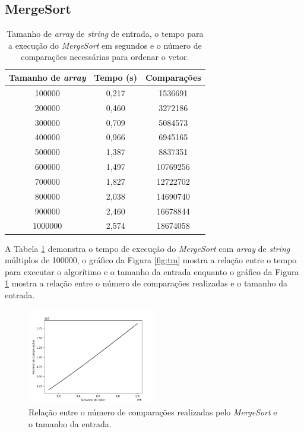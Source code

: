 \documentclass[12pt,a4paper,oneside]{article}
\begin{document}
\subsection{MergeSort}

\begin{table}[H]
\caption{Tamanho de \textit{array} de \textit{string} de entrada, o tempo para a execução do \textit{MergeSort} em segundos e o número de comparações necessárias para ordenar o vetor.}
\label{tab:dm}
\begin{center}
\begin{tabular}{|c c c|}
\hline
Tamanho de \textit{array}	& Tempo (s)	& Comparações 	\\
\hline
100000 & 0,217 & 1536691\\
200000 & 0,460 & 3272186\\
300000 & 0,709 & 5084573\\
400000 & 0,966 & 6945165\\
500000 & 1,387 & 8837351\\
600000 & 1,497 & 10769256\\
700000 & 1,827 & 12722702\\
800000 & 2,038 & 14690740\\
900000 & 2,460 & 16678844\\
1000000 & 2,574 & 18674058\\
\hline
\end{tabular}
\end{center}
\end{table}

\quad A Tabela \ref{tab:dm} demonstra o tempo de execução do \textit{MergeSort} com \textit{array} de \textit{string} múltiplos de 100000, o gráfico da Figura \ref{fig:tm} mostra a relação entre o tempo para executar o algorítimo e o tamanho da entrada enquanto o gráfico da Figura \ref{fig:nm} mostra a relação entre o número de comparações realizadas e o tamanho da entrada.

\begin{figure}[H]
\begin{center}
    \includegraphics[width=0.5\textwidth]{FigNM.png} 
\end{center}
\caption{Relação entre o número de comparações realizadas pelo \textit{MergeSort} e o tamanho da entrada.}
\label{fig:nm}
\end{figure}
\end{document}
